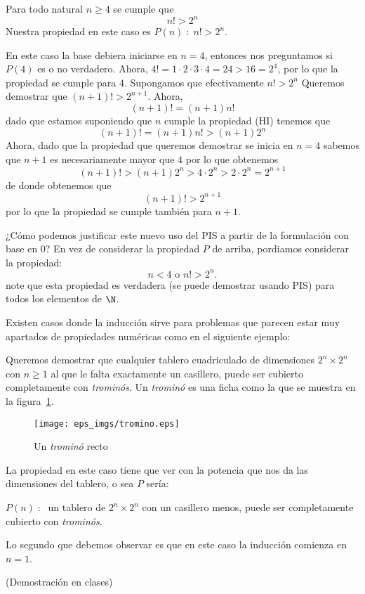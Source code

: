 \begin{ejemplo}
Para todo natural $n\geq 4$ se cumple que 
\[
n!>2^n
\]
Nuestra propiedad en este caso es $P(n)\;:\;n!>2^n$.

\begin{demostracion}
\begin{inducciondemo}
\BI En este caso la base debiera iniciarse en $n=4$, entonces nos preguntamos si $P(4)$ es o no verdadero.
Ahora, $4!=1\cdot 2\cdot 3\cdot 4=24>16=2^4$, por lo que la propiedad se cumple para $4$.
\HI Supongamos que efectivamente $n!>2^n$
\TI Queremos demostrar que $(n+1)!>2^{n+1}$.
Ahora, 
\[
(n+1)!=(n+1)n!
\]
dado que estamos suponiendo que $n$ cumple la propiedad (HI) tenemos que
\[
(n+1)!=(n+1)n!>(n+1)2^n
\]
Ahora, dado que la propiedad que queremos demostrar se inicia en $n=4$ sabemos que $n+1$ es necesariamente mayor que $4$ por lo que obtenemos
\[
(n+1)!>(n+1)2^n>4\cdot 2^n>2\cdot 2^n=2^{n+1}
\]
de donde obtenemos que
\[
(n+1)!>2^{n+1}
\]
por lo que la propiedad se cumple también para $n+1$.
\end{inducciondemo}
\end{demostracion}
\end{ejemplo}

¿Cómo podemos justificar este nuevo uso del PIS a partir de la formulación con base en 0?
En vez de considerar la propiedad $P$ de arriba, pordiamos considerar la propiedad:
\[
n<4 \text{ o }n!>2^n.
\]
note que esta propiedad es verdadera (se puede demostrar usando PIS) para todos los elementos de $\N$.

Existen casos donde la inducción sirve para problemas que parecen estar muy apartados de propiedades numéricas como en el siguiente ejemplo:

\begin{ejemplo}
Queremos demostrar que cualquier tablero cuadriculado de dimensiones $2^n\times 2^n$ con $n\geq 1$ al que le falta exactamente un casillero, puede ser cubierto completamente con \emph{trominós}.
Un \emph{trominó} es una ficha como la que se muestra en la figura~\ref{fig:tromino}.

\begin{figure}[h!]
\begin{center}
\texttt{[image: eps\_imgs/tromino.eps]}
\end{center}
\caption{Un \emph{trominó} recto}
\label{fig:tromino}
\end{figure}

La propiedad en este caso tiene que ver con la potencia que nos da las dimensiones del tablero, o sea $P$ sería:
\begin{center}
$P(n)\;:\;$ un tablero de $2^n\times 2^n$ con un casillero menos, puede ser completamente cubierto con \emph{trominós}.
\end{center}
Lo segundo que debemos observar es que en este caso la inducción comienza en $n=1$.

\begin{demostracion}
(Demostración en clases)
\end{demostracion}
\end{ejemplo}

